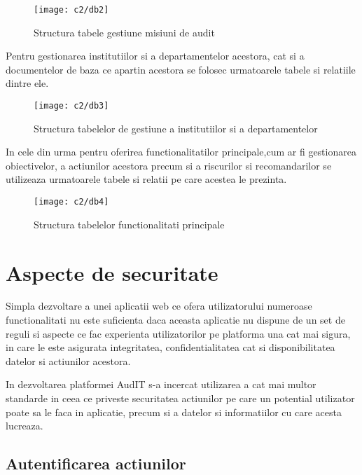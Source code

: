 \vspace{1cm}
\begin{figure}[h]
	\centering
	
	\texttt{[image: c2/db2]}
	\caption{Structura tabele gestiune misiuni de audit}
\end{figure}

\newpage
Pentru gestionarea institutiilor si a departamentelor acestora, cat si a documentelor de baza ce apartin acestora se folosec urmatoarele tabele si relatiile dintre ele.
\vspace{1cm}
\begin{figure}[h]
	\centering
	
	\texttt{[image: c2/db3]}
	\caption{Structura tabelelor de gestiune a institutiilor si a departamentelor}
\end{figure}

In cele din urma pentru oferirea functionalitatilor principale,cum ar fi gestionarea obiectivelor, a actiunilor acestora precum si a riscurilor si recomandarilor se utilizeaza urmatoarele tabele si relatii pe care acestea le prezinta.

\vspace{1cm}
\begin{figure}[h]
	\centering
	
	\texttt{[image: c2/db4]}
	\caption{Structura tabelelor functionalitati principale}
\end{figure}

\section{Aspecte de securitate}
Simpla dezvoltare a unei aplicatii web ce ofera utilizatorului numeroase functionalitati nu este suficienta daca aceasta aplicatie nu dispune de un set de reguli si aspecte ce  fac experienta utilizatorilor pe platforma una cat mai sigura, in care le este asigurata integritatea, confidentialitatea cat si disponibilitatea datelor si actiunilor acestora.

In dezvoltarea platformei AudIT s-a incercat utilizarea a cat mai multor standarde in ceea ce priveste securitatea actiunilor pe care un potential utilizator poate sa le faca in aplicatie, precum si a datelor si informatiilor cu care acesta lucreaza.

\subsection*{Autentificarea actiunilor}

